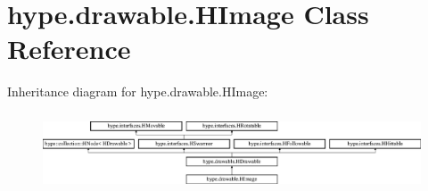 \hypertarget{classhype_1_1drawable_1_1_h_image}{\section{hype.\-drawable.\-H\-Image Class Reference}
\label{classhype_1_1drawable_1_1_h_image}
}
Inheritance diagram for hype.\-drawable.\-H\-Image\-:\begin{figure}[H]
\begin{center}
\leavevmode
\includegraphics[height=2.333333cm]{classhype_1_1drawable_1_1_h_image}
\end{center}
\end{figure}
